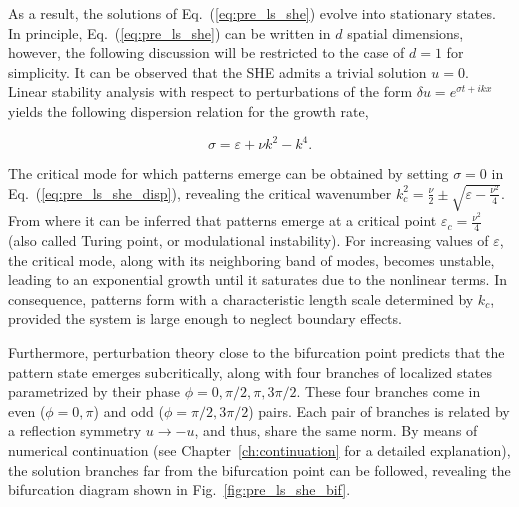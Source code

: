 As a result, the solutions of Eq.~(\ref{eq:pre_ls_she}) evolve into stationary states.
In principle, Eq.~(\ref{eq:pre_ls_she}) can be written in 
$d$ spatial dimensions, however, the following discussion will be restricted to the case of $d=1$ for simplicity.
It can be observed that the SHE admits a trivial solution $u=0$. Linear
stability analysis with respect to perturbations of the form $\delta u = e^{\sigma t + ikx}$ yields
the following dispersion relation for the growth rate,

\begin{equation}
    \sigma = \varepsilon + \nu k^2 - k^4.
    \label{eq:pre_ls_she_disp}
\end{equation}

The critical mode for which patterns emerge can be obtained by setting $\sigma = 0$ in Eq.~(\ref{eq:pre_ls_she_disp}),
revealing the critical wavenumber $k_c^2 = \frac{\nu}{2} \pm \sqrt{\varepsilon - \frac{\nu^2}{4}}$. From where
it can be inferred that patterns emerge at a critical point $\varepsilon_c = \frac{\nu^2}{4}$ 
(also called Turing point, or modulational instability). For increasing values of $\varepsilon$,
the critical mode, along with its neighboring band of modes, becomes unstable, leading to an exponential growth
until it saturates due to the nonlinear terms. In consequence, patterns form with a characteristic length scale determined
by $k_c$, provided the system is large enough to neglect boundary effects.

Furthermore, perturbation theory close to the bifurcation point \cite{burke2007snakes}
predicts that the pattern state emerges subcritically, along with four branches of
localized states parametrized by their phase $\phi = 0, \pi/2, \pi, 3\pi/2$. These
four branches come in even ($\phi = 0, \pi$) and odd ($\phi = \pi/2, 3\pi/2$) pairs.
Each pair of branches is related by a reflection symmetry $u \to -u$, and thus,
share the same norm. By means of numerical continuation (see Chapter~\ref{ch:continuation}
for a detailed explanation),
the solution branches far from the bifurcation point can be followed, revealing the
bifurcation diagram shown in Fig.~\ref{fig:pre_ls_she_bif}.

